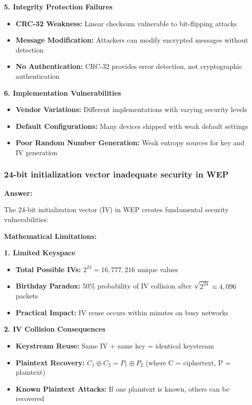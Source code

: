 \documentclass[12pt,a4paper]{article}
\begin{document}
\textbf{5. Integrity Protection Failures}
\begin{itemize}
    \item \textbf{CRC-32 Weakness:} Linear checksum vulnerable to bit-flipping attacks
    \item \textbf{Message Modification:} Attackers can modify encrypted messages without detection
    \item \textbf{No Authentication:} CRC-32 provides error detection, not cryptographic authentication
\end{itemize}

\textbf{6. Implementation Vulnerabilities}
\begin{itemize}
    \item \textbf{Vendor Variations:} Different implementations with varying security levels
    \item \textbf{Default Configurations:} Many devices shipped with weak default settings
    \item \textbf{Poor Random Number Generation:} Weak entropy sources for key and IV generation
\end{itemize}

\subsubsection{24-bit initialization vector inadequate security in WEP}

\textbf{Answer:}

The 24-bit initialization vector (IV) in WEP creates fundamental security vulnerabilities:

\textbf{Mathematical Limitations:}

\textbf{1. Limited Keyspace}
\begin{itemize}
    \item \textbf{Total Possible IVs:} $2^{24} = 16,777,216$ unique values
    \item \textbf{Birthday Paradox:} 50\% probability of IV collision after $\sqrt{2^{24}} \approx 4,096$ packets
    \item \textbf{Practical Impact:} IV reuse occurs within minutes on busy networks
\end{itemize}

\textbf{2. IV Collision Consequences}
\begin{itemize}
    \item \textbf{Keystream Reuse:} Same IV + same key = identical keystream
    \item \textbf{Plaintext Recovery:} $C_1 \oplus C_2 = P_1 \oplus P_2$ (where C = ciphertext, P = plaintext)
    \item \textbf{Known Plaintext Attacks:} If one plaintext is known, others can be recovered
\end{itemize}
\end{document}
